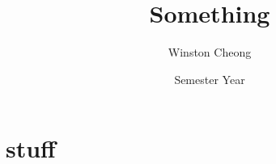 \documentclass[11pt]{scrartcl}
\title{Something}
\author{Winston Cheong}
\date{Semester Year}
\begin{document}
\maketitle
\tableofcontents

\section{stuff}
\end{document}
